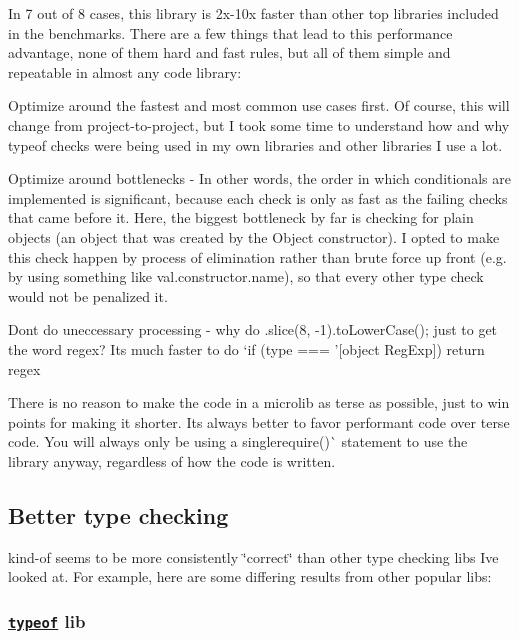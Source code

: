 In 7 out of 8 cases, this library is 2x-\/10x faster than other top libraries included in the benchmarks. There are a few things that lead to this performance advantage, none of them hard and fast rules, but all of them simple and repeatable in almost any code library\+:


\begin{DoxyEnumerate}
\item Optimize around the fastest and most common use cases first. Of course, this will change from project-\/to-\/project, but I took some time to understand how and why {\ttfamily typeof} checks were being used in my own libraries and other libraries I use a lot.
\item Optimize around bottlenecks -\/ In other words, the order in which conditionals are implemented is significant, because each check is only as fast as the failing checks that came before it. Here, the biggest bottleneck by far is checking for plain objects (an object that was created by the {\ttfamily Object} constructor). I opted to make this check happen by process of elimination rather than brute force up front (e.\+g. by using something like {\ttfamily val.\+constructor.\+name}), so that every other type check would not be penalized it.
\item Don\textquotesingle{}t do uneccessary processing -\/ why do {\ttfamily .slice(8, -\/1).to\+Lower\+Case();} just to get the word {\ttfamily regex}? It\textquotesingle{}s much faster to do `if (type === '\mbox{[}object Reg\+Exp\mbox{]}\textquotesingle{}) return \textquotesingle{}regex\textquotesingle{}{\ttfamily }
\item {\ttfamily There is no reason to make the code in a microlib as terse as possible, just to win points for making it shorter. It\textquotesingle{}s always better to favor performant code over terse code. You will always only be using a single}require()\`{} statement to use the library anyway, regardless of how the code is written.
\end{DoxyEnumerate}

\subsection*{Better type checking}

kind-\/of seems to be more consistently \char`\"{}correct\char`\"{} than other type checking libs I\textquotesingle{}ve looked at. For example, here are some differing results from other popular libs\+:

\subsubsection*{\href{https://github.com/CodingFu/typeof}{\tt typeof} lib}

